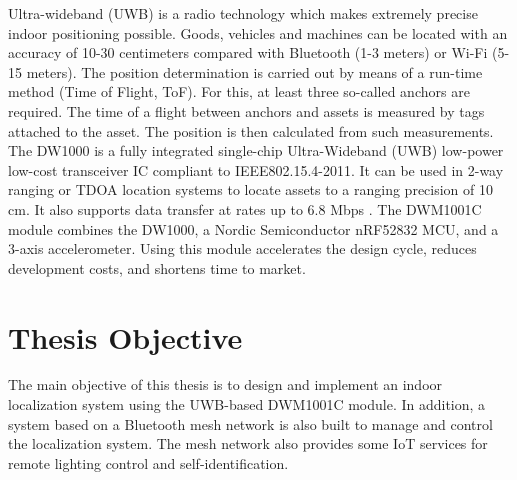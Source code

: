 \documentclass[\main/main.tex]{subfiles}
\begin{document}
Ultra-wideband (UWB) is a radio technology which makes extremely precise indoor positioning possible. Goods, vehicles and machines can be located with an accuracy of 10-30 centimeters compared with Bluetooth (1-3 meters) or Wi-Fi (5-15 meters). The position determination is carried out by means of a run-time method (Time of Flight, ToF). For this, at least three so-called anchors are required. The time of a flight between anchors and assets is measured by tags attached to the asset. The position is then calculated from such measurements.
\newline\newline
The DW1000 is a fully integrated single-chip Ultra-Wideband (UWB) low-power low-cost transceiver IC compliant to IEEE802.15.4-2011. It can be used in 2-way ranging or TDOA location systems to locate assets to a ranging precision of 10 cm. It also supports data transfer at rates up to 6.8 Mbps \cite{decawave:dw1000_datasheet}.
\newline\newline
The DWM1001C module combines the DW1000, a Nordic Semiconductor nRF52832 MCU, and a 3-axis accelerometer. Using this module accelerates the design cycle, reduces development costs, and shortens time to market.

\section{Thesis Objective}
The main objective of this thesis is to design and implement an indoor localization system using the UWB-based DWM1001C module. In addition, a system based on a Bluetooth mesh network is also built to manage and control the localization system. The mesh network also provides some IoT services for remote lighting control and self-identification.

\end{document}
